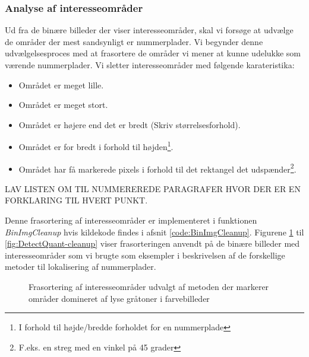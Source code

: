 \subsubsection{Analyse af interesseområder}
\label{sec:BinImgCleanup}
Ud fra de binære billeder der viser interesseområder, skal vi forsøge at udvælge de områder der mest sandsynligt er nummerplader. Vi begynder denne udvælgelsesproces med at frasortere de områder vi mener at kunne udelukke som værende nummerplader. Vi sletter interesseområder med følgende karateristika:
\begin{itemize}
\item Området er meget lille.
\item Området er meget stort.
\item Området er højere end det er bredt (Skriv størrelsesforhold).
\item Området er for bredt i forhold til højden\footnote{I forhold til højde/bredde forholdet for en nummerplade}.
\item Området har få markerede pixels i forhold til det rektangel det udspænder\footnote{F.eks. en streg med en vinkel på 45 grader}.
\end{itemize}

LAV LISTEN OM TIL NUMMEREREDE PARAGRAFER HVOR DER ER EN FORKLARING TIL HVERT PUNKT.

Denne frasortering af interesseområder er implementeret i funktionen \textit{BinImgCleanup} hvis kildekode findes i afsnit \ref{code:BinImgCleanup}. Figurene \ref{fig:DetectSameness-cleanup} til \ref{fig:DetectQuant-cleanup} viser frasorteringen anvendt på de binære billeder med interesseområder som vi brugte som eksempler i beskrivelsen af de forskellige metoder til lokalisering af nummerplader. 

\begin{figure}[htbp]
  \centering
  \begin{minipage}[b]{5 cm}
  \end{minipage}
  \begin{minipage}[b]{5 cm}
  \end{minipage}
  \caption{Frasortering af interesseområder udvalgt af metoden der markerer områder domineret af lyse gråtoner i farvebilleder}
  \label{fig:DetectSameness-cleanup}
\end{figure}

